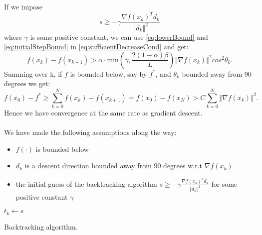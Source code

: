 \documentclass{article}
\newcommand{\norm}[1]{\left\Vert #1 \right\Vert}
\begin{document}
If we impose
\begin{equation}
s\geq-\gamma\frac{\nabla f(x_k)^Td_k}{\norm{d_k}^2}
\label{eq:initialStepBound}
\end{equation}
where $\gamma$ is some positive constant, we can use \ref{eq:lowerBound} and \ref{eq:initialStepBound} in \ref{eq:sufficientDecreaseCond} and get:
\begin{equation}
f(x_k) - f(x_{k+1}) >\alpha\cdot \text{min}\left(\gamma,\frac{2(1-\alpha)\beta}{L}\right ) \norm{\nabla f(x_k)}^2 cos^2\theta_k.
\end{equation}
Summing over k, if $f$ is bounded below, say by $f^*$, and $\theta_k$ bounded away from 90 degrees we get:
\begin{equation}
	f(x_0)-f^* \geq \sum_{k=0}^N f(x_k) - f(x_{k+1})  = f(x_0)-f(x_N) > C\sum_{k=0}^N\norm{\nabla f(x_k)}^2.
\end{equation}
Hence we have convergence at the same rate as gradient descent.\\\\
We have made the following assumptions along the way:
\begin{itemize}
	\item $f(\cdot)$ is bounded below
	\item $d_k$ is a descent direction bounded away from 90 degrees w.r.t $\nabla f(x_k)$
	\item the initial guess of the backtracking algorithm $s\geq- \gamma \frac{\nabla f(x_k)^Td_k}{\norm{d_k}^2}$ for some positive constant $\gamma$
\end{itemize}


\begin{algorithm}[!h]
	$t_k\gets s$\\
	\caption{Backtracking algorithm.}
	\label{algo:backtracking}
\end{algorithm}
 
\end{document}
